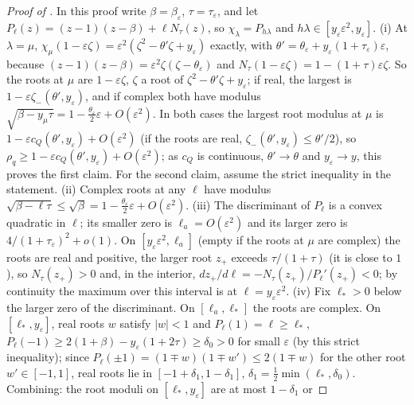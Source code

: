 \documentclass[11pt]{article}
\theoremstyle{definition}
\theoremstyle{remark}
\newcommand{\cQ}{c_{Q}}
\begin{document}
\begin{proof}[Proof of ]
In this proof write \(\beta=\beta_\varepsilon\), \(\tau=\tau_\varepsilon\), and let
\(P_\ell(z)=(z-1)(z-\beta)+\ell N_\tau(z)\), so
\(\chi_\lambda=P_{h\lambda}\) and \(h\lambda\in[y_\varepsilon\varepsilon^2,y_\varepsilon]\).
(i) At \(\lambda=\mu\), \(\chi_\mu(1-\varepsilon\zeta)=\varepsilon^2(\zeta^2-\theta'\zeta+y_\varepsilon)\) exactly,
with \(\theta'=\theta_\varepsilon+y_\varepsilon(1+\tau_\varepsilon)\varepsilon\), because
\((z-1)(z-\beta)=\varepsilon^2\zeta(\zeta-\theta_\varepsilon)\) and
\(N_\tau(1-\varepsilon\zeta)=1-(1+\tau)\varepsilon\zeta\).  So the roots at \(\mu\) are \(1-\varepsilon\zeta\), \(\zeta\) a
root of \(\zeta^2-\theta'\zeta+y_\varepsilon\); if real, the largest is
\(1-\varepsilon\zeta_-(\theta',y_\varepsilon)\), and if complex both have modulus
\(\sqrt{\beta-y_\mu\tau}=1-\frac{\theta_\varepsilon}2\varepsilon+O(\varepsilon^2)\).  In both cases the largest root
modulus at \(\mu\) is \(1-\varepsilon\cQ(\theta',y_\varepsilon)+O(\varepsilon^2)\) (if the roots are real,
\(\zeta_-(\theta',y_\varepsilon)\le\theta'/2\)), so \(\rho_q\ge1-\varepsilon\cQ(\theta',y_\varepsilon)+O(\varepsilon^2)\); as \(\cQ\) is continuous,
\(\theta'\to\theta\) and \(y_\varepsilon\to y\), this proves the first claim.  For the second claim, assume the strict inequality in the statement.
(ii) Complex roots at any \(\ell\) have modulus \(\sqrt{\beta-\ell\tau}\le\sqrt\beta=1-\frac{\theta_\varepsilon}2\varepsilon+O(\varepsilon^2)\).
(iii) The discriminant of \(P_\ell\) is a convex quadratic in \(\ell\); its smaller
zero is \(\ell_a=O(\varepsilon^2)\) and its larger zero is \(4/(1+\tau_\varepsilon)^2+o(1)\).  On
\([y_\varepsilon\varepsilon^2,\ell_a]\) (empty if the roots at \(\mu\) are complex) the roots are real and positive, the larger root \(z_+\) exceeds
\(\tau/(1+\tau)\) (it is close to \(1\)), so \(N_\tau(z_+)>0\) and, in the interior,
\(dz_+/d\ell=-N_\tau(z_+)/P_\ell'(z_+)<0\); by continuity the maximum over this interval is at
\(\ell=y_\varepsilon\varepsilon^2\).
(iv) Fix \(\ell_*>0\) below the larger zero of the discriminant.  On \([\ell_a,\ell_*]\)
the roots are complex.  On \([\ell_*,y_\varepsilon]\), real roots \(w\) satisfy \(|w|<1\) and
\(P_\ell(1)=\ell\ge\ell_*\), \(P_\ell(-1)\ge2(1+\beta)-y_\varepsilon(1+2\tau)\ge\delta_0>0\) for small
\(\varepsilon\) (by this strict inequality); since \(P_\ell(\pm1)=(1\mp w)(1\mp w')\le2(1\mp w)\) for the
other root \(w'\in[-1,1]\), real roots lie in \([-1+\delta_1,1-\delta_1]\),
\(\delta_1=\frac12\min(\ell_*,\delta_0)\).
Combining: the root moduli on \([\ell_*,y_\varepsilon]\) are at most \(1-\delta_1\) or

\end{proof}
\end{document}
